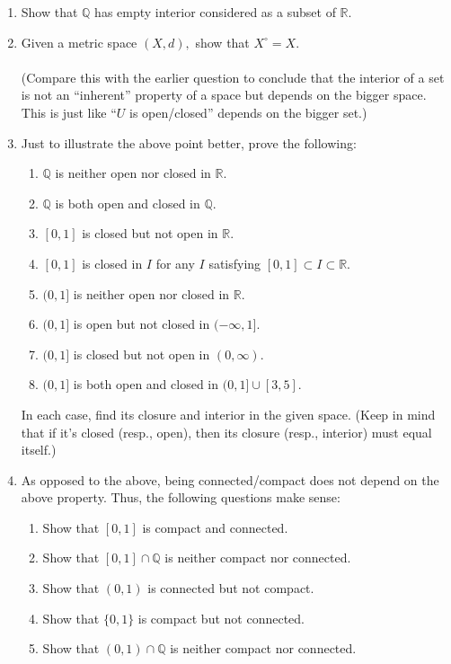 \documentclass[12pt]{article}
\theoremstyle{definition}
\numberwithin{thm}{section}
\begin{document}
\begin{enumerate}
	\item Show that $\mathbb{Q}$ has empty interior considered as a subset of $\mathbb{R}.$
	\item Given a metric space $(X, d),$ show that $X^\circ = X.$\\~\\
	(Compare this with the earlier question to conclude that the interior of a set is not an ``inherent'' property of a space but depends on the bigger space. This is just like ``$U$ is open/closed'' depends on the bigger set.)
	\item Just to illustrate the above point better, prove the following:
	\begin{enumerate}
		\item $\mathbb{Q}$ is neither open nor closed in $\mathbb{R}.$
		\item $\mathbb{Q}$ is both open and closed in $\mathbb{Q}.$
		\item $[0, 1]$ is closed but not open in $\mathbb{R}.$
		\item $[0, 1]$ is closed in $I$ for any $I$ satisfying $[0, 1] \subset I \subset \mathbb{R}.$
		\item $(0, 1]$ is neither open nor closed in $\mathbb{R}.$
		\item $(0, 1]$ is open but not closed in $(-\infty, 1].$
		\item $(0, 1]$ is closed but not open in $(0, \infty).$
		\item $(0, 1]$ is both open and closed in $(0, 1] \cup [3, 5].$
	\end{enumerate}
	In each case, find its closure and interior in the given space. (Keep in mind that if it's closed (resp., open), then its closure (resp., interior) must equal itself.)
	\item As opposed to the above, being connected/compact does not depend on the above property. Thus, the following questions make sense:
	\begin{enumerate}
		\item Show that $[0, 1]$ is compact and connected.
		\item Show that $[0, 1]\cap \mathbb{Q}$ is neither compact nor connected.
		\item Show that $(0, 1)$ is connected but not compact.
		\item Show that $\{0, 1\}$ is compact but not connected.
		\item Show that $(0, 1)\cap \mathbb{Q}$ is neither compact nor connected.

\end{enumerate}
\end{enumerate}
\end{document}
